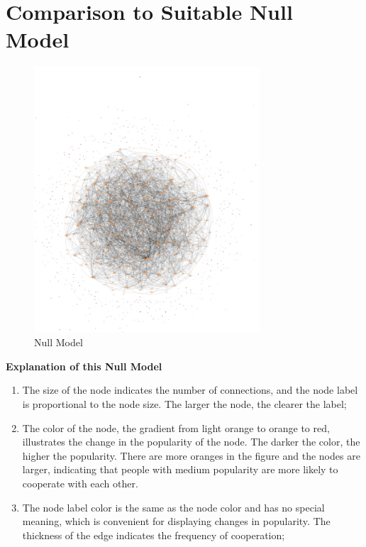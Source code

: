 \documentclass[12pt,a4paper]{article}
\begin{document}
\section{Comparison to Suitable Null Model}
\begin{figure}[H]
  \centering
  \includegraphics[width=0.75\textwidth]{null}
  \caption{Null Model}
\end{figure}
\textbf{Explanation of this Null Model}
\begin{enumerate}
  \item The size of the node indicates the number of connections, and the node label is proportional to the node size. The larger the node, the clearer the label;
  \item The color of the node, the gradient from light orange to orange to red, illustrates the change in the popularity of the node. The darker the color, the higher the popularity. There are more oranges in the figure and the nodes are larger, indicating that people with medium popularity are more likely to cooperate with each other.
  \item The node label color is the same as the node color and has no special meaning, which is convenient for displaying changes in popularity. The thickness of the edge indicates the frequency of cooperation;
\end{enumerate}
\end{document}
